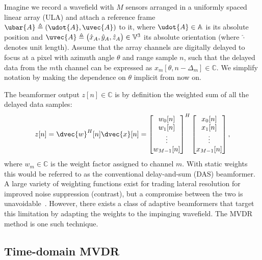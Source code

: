 {Imagine we record a wavefield with $M$ sensors arranged in a uniformly spaced linear array (ULA) and attach a reference frame $\ubar{A} \triangleq (\udot{A},\uvec{A})$ to it, where $\udot{A}\in\mathbb{A}$ is its absolute position and $\uvec{A}\triangleq\big(\hat{x}_{A},\hat{y}_{A},\hat{z}_{A}\big)\in\mathbb{V}^3$ its absolute orientation (where $\hat{\cdot}$ denotes unit length). Assume that the array channels are digitally delayed to focus at a pixel with azimuth angle $\theta$ and range sample $n$, such that the delayed data from the $m$th channel can be expressed as $x_m[\theta,n-\Delta_m]\in\mathbb{C}$. We simplify notation by making the dependence on $\theta$ implicit from now on. 

The beamformer output $z[n]\in\mathbb{C}$ is by definition the weighted sum of all the delayed data samples:
%
\begin{align}
z[n] = \dvec{w}^H[n]\dvec{x}[n] = \bmat{w_0[n]\\w_1[n]\\\vdots\\w_{M-1}[n]}^H \bmat{x_0[n]\\x_1[n]\\\vdots\\x_{M-1}[n]},\label{2_eq_z}
\end{align}
%
where $w_m\in\mathbb{C}$ is the weight factor assigned to channel $m$. With static weights this would be referred to as the conventional delay-and-sum (DAS) beamformer. A large variety of weighting functions exist for trading lateral resolution for improved noise suppression (contrast), but a compromise between the two is unavoidable~\cite{Harris1978}. However, there exists a class of adaptive beamformers that target this limitation by adapting the weights to the impinging wavefield. The MVDR method is one such technique.



\subsection{Time-domain MVDR}

}
